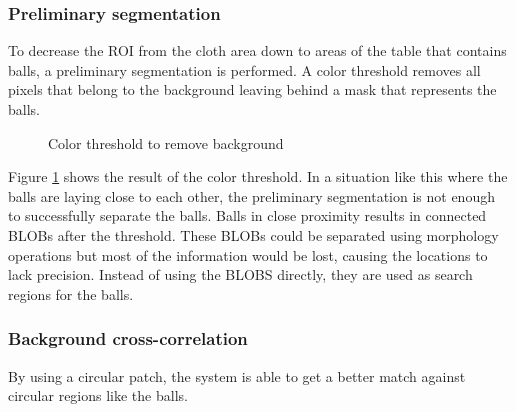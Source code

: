 \subsubsection{Preliminary segmentation}
To decrease the ROI from the cloth area down to areas of the table that contains balls, a preliminary segmentation is performed. A color threshold removes all pixels that belong to the background leaving behind a mask that represents the balls.
\begin{figure}[h]
  \centering
  \quad           
   \caption{Color threshold to remove background}
  \label{fig:thres1}
\end{figure}
Figure \ref{fig:thres1} shows the result of the color threshold. In a situation like this where the balls are laying close to each other, the preliminary segmentation is not enough to successfully separate the balls. Balls in close proximity results in connected BLOBs after the threshold. These BLOBs could be separated using morphology operations but most of the information would be lost, causing the locations to lack precision. Instead of using the BLOBS directly, they are used as search regions for the balls.

\subsubsection{Background cross-correlation}
By using a circular patch, the system is able to get a better match against circular regions like the balls.

